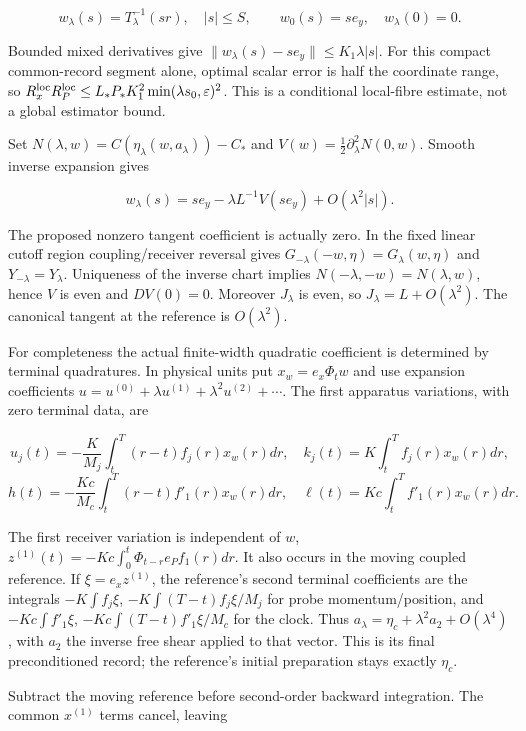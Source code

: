 \documentclass[11pt,a4paper]{article}
\begin{document}
\[w_\lambda(s)=T_\lambda^{-1}(sr),\quad |s|\le S,
\qquad w_0(s)=se_y,\quad w_\lambda(0)=0.\]

Bounded mixed derivatives give
\(\|w_\lambda(s)-se_y\|\le K_1\lambda|s|\). For this compact
common-record segment alone, optimal scalar error is half the coordinate
range, so
\(R_x^{\rm loc}R_P^{\rm loc}\le L_*P_*K_1^2\min(\lambda s_0,\varepsilon)^2\).
This is a conditional local-fibre estimate, not a global estimator
bound.

Set \(N(\lambda,w)=C(\eta_\lambda(w,a_\lambda))-C_*\) and
\(V(w)=\tfrac12\partial_\lambda^2N(0,w)\). Smooth inverse expansion
gives

\[w_\lambda(s)=se_y-\lambda L^{-1}V(se_y)+O(\lambda^2|s|).\]

The proposed nonzero tangent coefficient is actually zero. In the fixed
linear cutoff region coupling/receiver reversal gives
\(G_{-\lambda}(-w,\eta)=G_\lambda(w,\eta)\) and
\(Y_{-\lambda}=Y_\lambda\). Uniqueness of the inverse chart implies
\(N(-\lambda,-w)=N(\lambda,w)\), hence \(V\) is even and \(DV(0)=0\).
Moreover \(J_\lambda\) is even, so \(J_\lambda=L+O(\lambda^2)\). The
canonical tangent at the reference is \(O(\lambda^2)\).

For completeness the actual finite-width quadratic coefficient is
determined by terminal quadratures. In physical units put
\(x_w=e_x\Phi_tw\) and use expansion coefficients
\(u=u^{(0)}+\lambda u^{(1)}+\lambda^2u^{(2)}+\cdots\). The first
apparatus variations, with zero terminal data, are

\[u_j(t)=-\frac K{M_j}\int_t^T(r-t)f_j(r)x_w(r)dr,
\quad k_j(t)=K\int_t^Tf_j(r)x_w(r)dr,\]
\[h(t)=-\frac{Kc}{M_c}\int_t^T(r-t)f'_1(r)x_w(r)dr,
\quad\ell(t)=Kc\int_t^Tf'_1(r)x_w(r)dr.\]

The first receiver variation is independent of \(w\),
\(z^{(1)}(t)=-Kc\int_0^t\Phi_{t-r}e_Pf_1(r)dr\). It also occurs in the
moving coupled reference. If \(\xi=e_xz^{(1)}\), the reference's second
terminal coefficients are the integrals \(-K\int f_j\xi\),
\(-K\int(T-t)f_j\xi/M_j\) for probe momentum/position, and
\(-Kc\int f'_1\xi\), \(-Kc\int(T-t)f'_1\xi/M_c\) for the clock. Thus
\(a_\lambda=\eta_c+\lambda^2a_2+O(\lambda^4)\), with \(a_2\) the inverse
free shear applied to that vector. This is its final preconditioned
record; the reference's initial preparation stays exactly \(\eta_c\).

Subtract the moving reference before second-order backward integration.
The common \(x^{(1)}\) terms cancel, leaving
\end{document}
